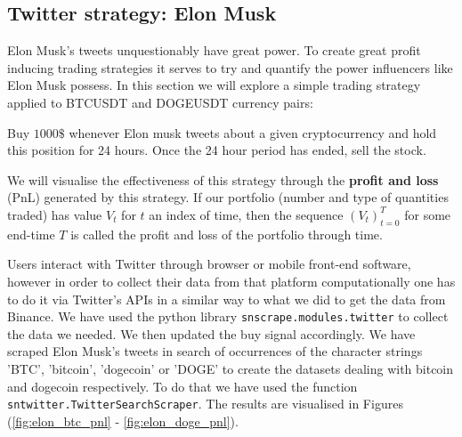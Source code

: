 \documentclass[twoside]{report}
\newcommand{\code}{\texttt}
\begin{document}
\begin{spacing}{1}
\subsection{Twitter strategy: Elon Musk}
Elon Musk's tweets unquestionably have great power. To create great profit inducing trading strategies it serves to try and quantify the power influencers like Elon Musk possess. In this section we will explore a simple trading strategy applied to BTCUSDT and DOGEUSDT currency pairs: \begin{strategy}
Buy $1000\text{\$}$ whenever Elon musk tweets about a given cryptocurrency and hold this position for 24 hours. Once the 24 hour period has ended, sell the stock.
\end{strategy}\label{strat:musk} 
We will visualise the effectiveness of this strategy through the \textbf{profit and loss} (PnL) generated by this strategy. If our portfolio (number and type of quantities traded) has value $V_t$ for $t$ an index of time, then the sequence $(V_t)_{t=0}^T$ for some end-time $T$ is called the profit and loss of the portfolio through time.

Users interact with Twitter through browser or mobile front-end software, however in order to collect their data from that platform computationally one has to do it via Twitter's APIs in a similar way to what we did to get the data from Binance.
We have used the python library \code{snscrape.modules.twitter} to collect the data we needed. We then updated the buy signal accordingly. We have scraped Elon Musk's tweets in search of occurrences of the character strings 'BTC', 'bitcoin', 'dogecoin' or 'DOGE' to create the datasets dealing with bitcoin and dogecoin respectively. To do that we have used the function \code{sntwitter.TwitterSearchScraper}. The results are visualised in Figures (\ref{fig:elon_btc_pnl} - \ref{fig:elon_doge_pnl}).


\end{spacing}
\end{document}

